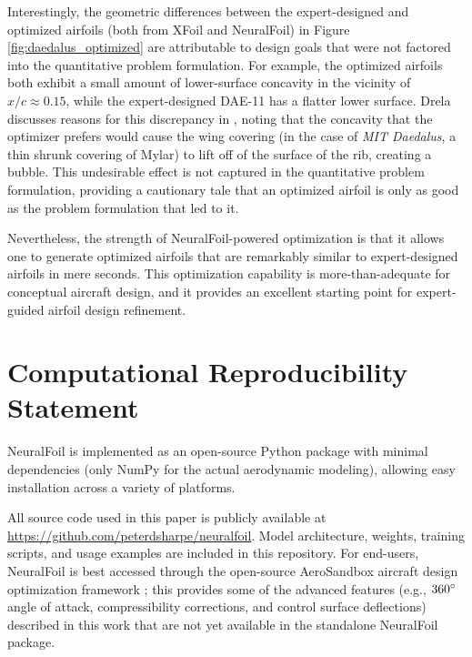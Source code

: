 \documentclass[journal]{new-aiaa}
\begin{document}
Interestingly, the geometric differences between the expert-designed and optimized airfoils (both from XFoil and NeuralFoil) in Figure \ref{fig:daedalus_optimized} are attributable to design goals that were not factored into the quantitative problem formulation. For example, the optimized airfoils both exhibit a small amount of lower-surface concavity in the vicinity of $x/c \approx 0.15$, while the expert-designed DAE-11 has a flatter lower surface. Drela discusses reasons for this discrepancy in \cite{drelaProsConsAirfoil1998}, noting that the concavity that the optimizer prefers would cause the wing covering (in the case of \emph{MIT Daedalus}, a thin shrunk covering of Mylar) to lift off of the surface of the rib, creating a bubble. This undesirable effect is not captured in the quantitative problem formulation, providing a cautionary tale that an optimized airfoil is only as good as the problem formulation that led to it.

Nevertheless, the strength of NeuralFoil-powered optimization is that it allows one to generate optimized airfoils that are remarkably similar to expert-designed airfoils in mere seconds. This optimization capability is more-than-adequate for conceptual aircraft design, and it provides an excellent starting point for expert-guided airfoil design refinement.


\section{Computational Reproducibility Statement}
\label{sec:reproducibility}

NeuralFoil is implemented as an open-source Python package with minimal dependencies (only NumPy \cite{harrisArrayProgrammingNumPy2020} for the actual aerodynamic modeling), allowing easy installation across a variety of platforms.

All source code used in this paper is publicly available at \url{https://github.com/peterdsharpe/neuralfoil}. Model architecture, weights, training scripts, and usage examples are included in this repository.
For end-users, NeuralFoil is best accessed through the open-source AeroSandbox aircraft design optimization framework \cite{sharpeAeroSandboxDifferentiableFramework2021}; this provides some of the advanced features (e.g., $360\degree$ angle of attack, compressibility corrections, and control surface deflections) described in this work that are not yet available in the standalone NeuralFoil package.
\end{document}
